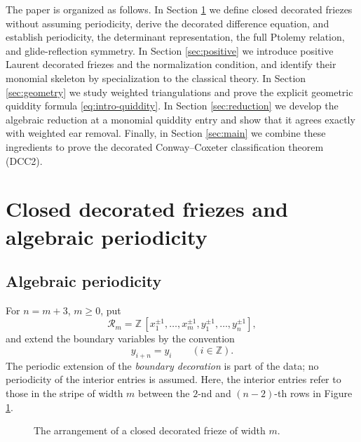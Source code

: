 \documentclass[amstex,11pt,reqno]{amsart}
\theoremstyle{definition}
\newcommand{\Z}{\mathbb Z}
\newcommand{\cR}{\mathscr R}
\begin{document}
The paper is organized as follows. In Section \ref{sec:periodicity} we
define closed decorated friezes without assuming periodicity, derive
the decorated difference equation, and establish periodicity,
the determinant representation, the full Ptolemy relation, and
glide-reflection symmetry. In Section \ref{sec:positive} we introduce
positive Laurent decorated friezes and the normalization condition,
and identify their monomial skeleton by specialization to the
classical theory. In Section \ref{sec:geometry} we study weighted
triangulations and prove the explicit geometric quiddity formula
\eqref{eq:intro-quiddity}. In Section \ref{sec:reduction} we
develop the algebraic reduction at a monomial quiddity entry and show
that it agrees exactly with weighted ear removal. Finally, in Section
\ref{sec:main} we combine these ingredients to prove the decorated
Conway--Coxeter classification theorem (DCC2).

\section{Closed decorated friezes and algebraic periodicity}\label{sec:periodicity}

\subsection{Algebraic periodicity}
For $n=m+3$, $m \geq 0$, put
\[
 \cR_m=\Z\,[x_1^{\pm1},\ldots,x_m^{\pm1},y_1^{\pm1},\ldots,y_n^{\pm1}],
\]
and extend the boundary variables by the convention
\[
 y_{i+n}=y_i\qquad (i\in\Z).
\]
The periodic extension of the \emph{boundary decoration} is part of the data; no periodicity of the interior entries is assumed.
Here, the interior entries refer to those in the stripe of width $m$ between the $2$-nd and $(n-2)$-th rows in 
Figure \ref{fig:frieze}.

\begin{figure}[h]
\centering
{}
\caption{The arrangement of a closed decorated frieze of width $m$.}
\label{fig:frieze}
\end{figure}
\end{document}
